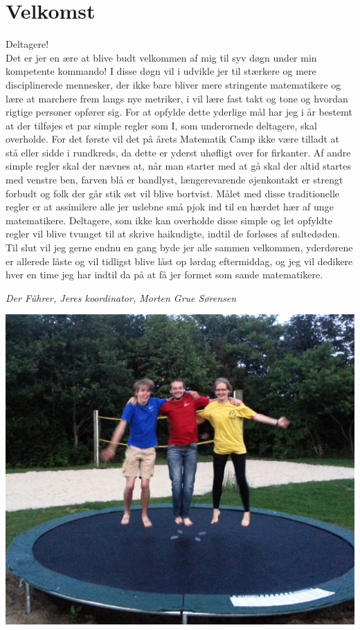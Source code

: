 \begin{minipage}[b]{0.95\linewidth}
\begin{minipage}[t]{0.47\textwidth}
\section*{Velkomst}
Deltagere!\\
Det er jer en ære at blive budt velkommen af mig til syv døgn under min kompetente kommando! I disse døgn vil i udvikle jer til stærkere og mere disciplinerede mennesker, der ikke bare bliver mere stringente matematikere og lære at marchere frem langs nye metriker, i vil lære fast takt og tone og hvordan rigtige personer opfører sig. For at opfylde dette yderlige mål har jeg i år bestemt at der tilføjes et par simple regler som I, som underornede deltagere, skal overholde. For det første vil det på årets Matematik Camp ikke være tilladt at stå eller sidde i rundkreds, da dette er yderst uhøfligt over for firkanter. Af andre simple regler skal der nævnes at, når man starter med at gå skal der altid startes med venstre ben, farven blå er bandlyst, længerevarende øjenkontakt er strengt forbudt og folk der går stik øst vil blive bortvist. Målet med disse traditionelle regler er at assimilere alle jer uslebne små pjok ind til en hærdet hær af unge matematikere. Deltagere, som ikke kan overholde disse simple og let opfyldte regler vil blive tvunget til at skrive haikudigte, indtil de forløses af sultedøden. Til slut vil jeg gerne endnu en gang byde jer alle sammen velkommen, yderdørene er allerede låste og vil tidligst blive låst op lørdag eftermiddag, og jeg vil dedikere hver en time jeg har indtil da på at få jer formet som sande matematikere.

{\flushright\emph{Der Führer, Jeres koordinator, Morten Grue Sørensen}}

\begin{center}
\includegraphics[width=\linewidth]{koordinatorer2.jpg}
\end{center}

\end{minipage}
\end{minipage}
